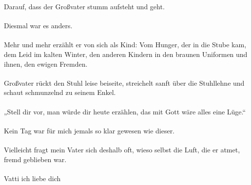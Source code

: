 Darauf, dass der Großvater stumm aufsteht und geht.\\\\
Diesmal war es anders.\\\\
Mehr und mehr erzählt er von sich als Kind: Vom Hunger, der in die Stube kam, dem Leid im kalten Winter, den anderen Kindern in den braunen Uniformen und ihnen, den ewigen Fremden. \\\\
Großvater rückt den Stuhl leise beiseite, streichelt sanft über die Stuhllehne und schaut schmunzelnd zu seinem Enkel.\\\\
„Stell dir vor, man würde dir heute erzählen, das mit Gott wäre alles eine Lüge.“\\\\
Kein Tag war für mich jemals so klar gewesen wie dieser. \\\\
Vielleicht fragt mein Vater sich deshalb oft, wieso selbst die Luft, die er atmet, fremd geblieben war.\\\\

Vatti ich liebe dich
